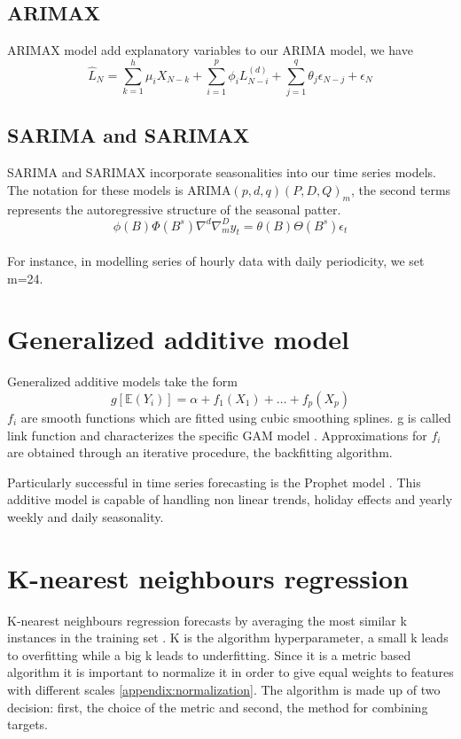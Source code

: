 \subsection{ARIMAX}
ARIMAX model add explanatory variables to our ARIMA model, we have
\begin{equation}
    \hat{L}_N=\sum\limits_{k=1}^{h} \mu_i X_{N-k}+\sum\limits_{i=1}^{p}\phi_i L_{N-i}^{(d)}+\sum\limits_{j=1}^{q}\theta_j \epsilon_{N-j}+ \epsilon_{N}
\end{equation}
\subsection{SARIMA and SARIMAX}
SARIMA and SARIMAX incorporate seasonalities into our time series models. The notation for these models is ARIMA$(p,d,q)(P,D,Q)_m$, the second terms represents the autoregressive structure of the seasonal patter.
\\
\begin{equation}
    \phi(B)\Phi(B^s)\nabla^d\nabla_m^Dy_t=\theta(B)\Theta(B^s)\epsilon_t
\end{equation}
\\
For instance, in modelling series of hourly data with daily periodicity, we set m=24.

\section{Generalized additive model}
Generalized additive models take the form
\begin{equation}
    g[\mathbb{E}(Y_i)]=\alpha+f_1(X_1)+\dots+f_p(X_p)
\end{equation}
$f_i$ are smooth functions which are fitted using cubic smoothing splines.
g is called link function and characterizes the specific GAM model \cite{hastie2017generalized}. Approximations for $f_i$ are obtained through an iterative procedure, the backfitting algorithm.

Particularly successful in time series forecasting is the Prophet model \cite{taylor2018forecasting}. This additive model is capable of handling non linear trends, holiday effects and yearly weekly and daily seasonality.
\section{K-nearest neighbours regression}
K-nearest neighbours regression forecasts by averaging the most similar k instances in the training set \cite{macqueen1967some}. K is the algorithm hyperparameter, a small k leads to overfitting while a big k leads to underfitting. 
Since it is a metric based algorithm it is important to normalize it in order to give equal weights to features with different scales \ref{appendix:normalization}.
The algorithm is made up of two decision: first, the choice of the metric and second, the method for combining targets.


